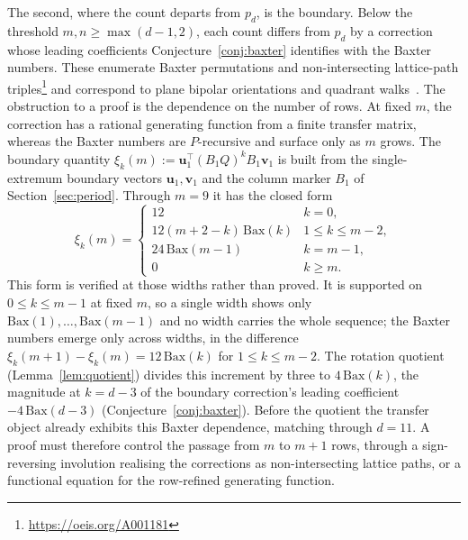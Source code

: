 \documentclass[11pt]{article}
\theoremstyle{definition}
\theoremstyle{remark}
\begin{document}
The second, where the count departs from $p_d$, is the boundary. Below the
threshold $m,n\ge\max(d-1,2)$, each count differs from $p_d$ by a correction
whose leading coefficients Conjecture~\ref{conj:baxter} identifies with the
Baxter numbers. These enumerate Baxter permutations and non-intersecting
lattice-path triples\footnote{\url{https://oeis.org/A001181}} and correspond to
plane bipolar orientations and quadrant walks~\cite{Felsner2011,BousquetMelou2019}. The obstruction to a proof
is the dependence on the number of rows. At fixed $m$, the correction has a
rational generating function from a finite transfer matrix, whereas the Baxter
numbers are $P$-recursive and surface only as $m$ grows. The boundary quantity
$\xi_k(m):=\mathbf u_1^{\!\top}(B_1Q)^kB_1\mathbf v_1$ is built from the
single-extremum boundary vectors $\mathbf u_1,\mathbf v_1$ and the column marker
$B_1$ of Section~\ref{sec:period}. Through $m=9$ it has the closed form
\[
  \xi_k(m)=
  \begin{cases}
    12 & k=0,\\
    12(m+2-k)\,\mathrm{Bax}(k) & 1\le k\le m-2,\\
    24\,\mathrm{Bax}(m-1) & k=m-1,\\
    0 & k\ge m.
  \end{cases}
\]
This form is verified at those widths rather than proved. It is supported on
$0\le k\le m-1$ at fixed $m$, so a single width shows only
$\mathrm{Bax}(1),\dots,\mathrm{Bax}(m-1)$ and no width carries the whole sequence;
the Baxter numbers emerge only across widths, in the difference
$\xi_k(m+1)-\xi_k(m)=12\,\mathrm{Bax}(k)$ for $1\le k\le m-2$. The rotation
quotient (Lemma~\ref{lem:quotient}) divides this increment by three to
$4\,\mathrm{Bax}(k)$, the magnitude at $k=d-3$ of the boundary correction's
leading coefficient $-4\,\mathrm{Bax}(d-3)$ (Conjecture~\ref{conj:baxter}). Before the quotient the
transfer object already exhibits this Baxter dependence, matching through $d=11$. A proof must
therefore control the passage from $m$ to $m+1$ rows, through a sign-reversing
involution realising the corrections as non-intersecting lattice paths, or a
functional equation for the row-refined generating function.
\end{document}

